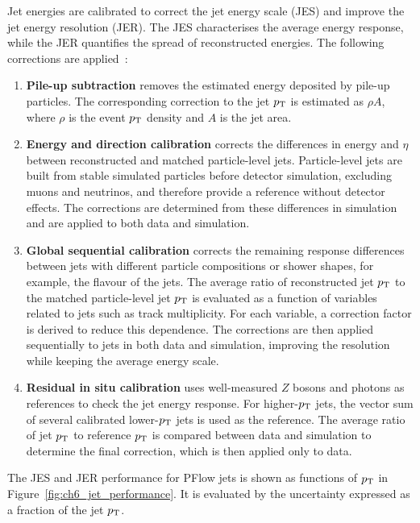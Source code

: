 Jet energies are calibrated to correct the jet energy scale (JES) and improve the jet energy resolution (JER).
The JES characterises the average energy response, while the JER quantifies the spread of reconstructed energies.
The following corrections are applied~\cite{ATLAS2021JetCalibration}:
\begin{enumerate}
    \item \textbf{Pile-up subtraction} removes the estimated energy deposited by pile-up particles. The corresponding correction to the jet $p_{\mathrm{T}}$ is estimated as $\rho A$, where $\rho$ is the event $p_{\mathrm{T}}$ density and $A$ is the jet area.
    \item \textbf{Energy and direction calibration} corrects the differences in energy and $\eta$ between reconstructed and matched particle-level jets. Particle-level jets are built from stable simulated particles before detector simulation, excluding muons and neutrinos, and therefore provide a reference without detector effects. The corrections are determined from these differences in simulation and are applied to both data and simulation.
    \item \textbf{Global sequential calibration} corrects the remaining response differences between jets with different particle compositions or shower shapes, for example, the flavour of the jets. The average ratio of reconstructed jet $p_{\mathrm{T}}$ to the matched particle-level jet $p_{\mathrm{T}}$ is evaluated as a function of variables related to jets such as track multiplicity. For each variable, a correction factor is derived to reduce this dependence. The corrections are then applied sequentially to jets in both data and simulation, improving the resolution while keeping the average energy scale.
    \item \textbf{Residual in situ calibration} uses well-measured $Z$ bosons and photons as references to check the jet energy response. For higher-$p_{\mathrm{T}}$ jets, the vector sum of several calibrated lower-$p_{\mathrm{T}}$ jets is used as the reference. The average ratio of jet $p_{\mathrm{T}}$ to reference $p_{\mathrm{T}}$ is compared between data and simulation to determine the final correction, which is then applied only to data.
\end{enumerate}

The JES and JER performance for PFlow jets is shown as functions of $p_{\mathrm{T}}$ in Figure~\ref{fig:ch6_jet_performance}. It is evaluated by the uncertainty expressed as a fraction of the jet $p_{\mathrm{T}}$.

